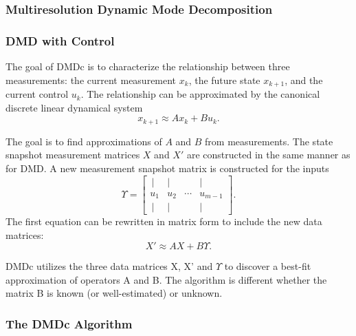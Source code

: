 \documentclass{article}
\begin{document}
\vspace{1cm}

\subsubsection*{Multiresolution Dynamic Mode Decomposition}

\vspace{1cm}

\vspace{1cm}

\subsubsection*{DMD with Control}

\vspace{1cm}

The goal of DMDc is to characterize the relationship between three measurements:
the current measurement $x_k$, the future state $x_{k+1}$, and the current control
$u_k$. The relationship can be approximated by the canonical discrete linear
dynamical system
\[
    x_{k+1} \approx A x_k + B u_k.
\]

The goal is to find approximations of $A$ and $B$ from measurements. 
The state snapshot measurement matrices $X$ and $X'$ are constructed in the same
manner as for DMD. A new measurement snapshot matrix is constructed for the inputs
\[
    \Upsilon =
    \begin{bmatrix}
        \,| & | &  & |\, \\
        u_1 & u_2 & \cdots & u_{m-1} \\
        \,| & | &  & |\, 
    \end{bmatrix}.
\]
The first equation can be rewritten in matrix form to include the new data matrices:
\[
    X' \approx A X + B \Upsilon.
\]

DMDc utilizes the three data matrices X, X' and $ \Upsilon $ to discover a best-fit approximation of operators A and B. The algorithm is different whether the matrix B is known (or well-estimated) or unknown.

\vspace{1cm}

\subsubsection*{The DMDc Algorithm}

\vspace{1cm}
\end{document}
